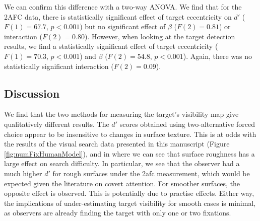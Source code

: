 \documentclass[man]{apa6}
\begin{document}
We can confirm this difference with a two-way ANOVA. We find that for the 2AFC data, there is statistically significant effect of target eccentricity on $d'$ ($F(1)=67.7$, $p<0.001$) but no significant effect of $\beta$ ($F(2)=0.81$) or interaction ($F(2)=0.80$). However, when looking at the target detection results, we find a statistically significant effect of target eccentricity ($F(1)=70.3$, $p<0.001$) and $\beta$ ($F(2)=54.8$, $p<0.001$). Again, there was no statistically significant interaction ($F(2)=0.09$).

\subsection{Discussion}

We find that the two methods for measuring the target's visibility map give qualitatively different results. The $d'$ scores obtained using two-alternative forced choice appear to be insensitive to changes in surface texture. This is at odds with the results of the visual search data presented in this manuscript (Figure \ref{fig:numFixHumanModel}), and in \textcite{clarke2008, clarke2009} where we can see that surface roughness has a large effect on search difficulty. In particular, we see that the observer had a much higher $d'$ for rough surfaces under the 2afc measurement, which would be expected given the literature on covert attention. For smoother surfaces, the opposite effect is observed. This is potentially due to practise effects. Either way, the implications of under-estimating target visibility for smooth cases is minimal, as observers are already finding the target with only one or two fixations.  
\end{document}
